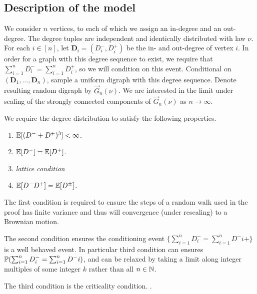 \subsection{Description of the model}

We consider $n$ vertices, to each of which we assign an in-degree and an out-degree. The degree tuples are independent and identically distributed with law $\nu$. For each $i\in [n]$, let $\mathbf{D}_i=(D^-_i,D^+_i)$ be the in- and out-degree of vertex $i$. In order for a graph with this degree sequence to exist, we require that $\sum_{i=1}^n D^-_i=\sum_{i=1}^n D^+_i$, so we will condition on this event. Conditional on $(\mathbf{D}_1,\dots,\mathbf{D}_n)$, sample a uniform digraph with this degree sequence. Denote resulting random digraph by $\vec{G}_n(\nu)$. We are interested in the limit under scaling of the strongly connected components of $\vec{G}_n(\nu)$ as $n\to \infty$.

We require the degree distribution to satisfy the following properties.

\begin{enumerate}
    \item $\E[(D^- + D^+)^3] < \infty$.
    \item $\E[D^-] = \E[D^+]$.
    \item \emph{lattice condition}
    \item $\E[D^- D^+] = \E[D^{\pm}]$.
\end{enumerate}

The first condition is required to ensure the steps of a random walk used in the proof has finite variance and thus will convergence (under rescaling) to a Brownian motion.

The second condition ensures the conditioning event $\{\sum_{i=1}^n D_i^- = \sum_{i=1}^n D^-i+\}$ is a well behaved event. In particular third condition can ensures $\P(\sum_{i=1}^n D_i^- = \sum_{i=1}^n D^-i)$, and can be relaxed by taking a limit along integer multiples of some integer $k$ rather than all $n \in \N$.

The third condition is the criticality condition. .

